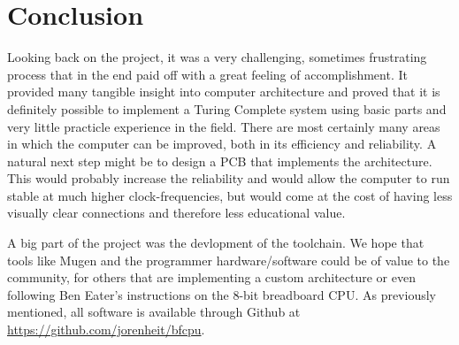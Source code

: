 \section{Conclusion}



Looking back on the project, it was a very challenging, sometimes frustrating process that in the end paid off with a great feeling of accomplishment. It provided many tangible insight into computer architecture and proved that it is definitely possible to implement a Turing Complete system using basic parts and very little practicle experience in the field. There are most certainly many areas in which the computer can be improved, both in its efficiency and reliability. A natural next step might be to design a PCB that implements the architecture. This would probably increase the reliability and would allow the computer to run stable at much higher clock-frequencies, but would come at the cost of having less visually clear connections and therefore less educational value.

A big part of the project was the devlopment of the toolchain. We hope that tools like Mugen and the programmer hardware/software could be of value to the community, for others that are implementing a custom architecture or even following Ben Eater's instructions on the 8-bit breadboard CPU. As previously mentioned, all software is available through Github at \url{https://github.com/jorenheit/bfcpu}.

